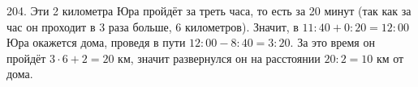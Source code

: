 204. Эти 2 километра Юра пройдёт за треть часа, то есть за 20 минут (так как за час он проходит в 3 раза больше, 6 километров). Значит, в $11:40+0:20=12:00$ Юра окажется дома, проведя в пути $12:00-8:40=3:20.$ За это время он пройдёт $3\cdot6+2=20$ км, значит развернулся он на расстоянии $20:2=10$ км от дома.\\
